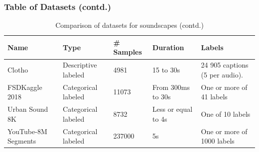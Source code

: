 \begin{frame}
    \frametitle{Table of Datasets (contd.)}

    \begin{table}[ht]
        \centering
        \caption{Comparison of datasets for soundscapes (contd.)}
        \begin{tabularx}{\textwidth}{|X|X|X|X|X|}
            \hline
            \textbf{Name}                                           &
            \textbf{Type}                                           &
            \textbf{\# Samples}                                     &
            \textbf{Duration}                                       &
            \textbf{Labels}                                           \\ \hline

            Clotho \cite{drossos_clotho_2019}                       &
            Descriptive labeled                                     &
            4981                                                    &
            15 to 30s                                               &
            24 905 captions (5 per audio).                            \\ \hline

            FSDKaggle 2018 \cite{fonseca_general-purpose_2018}      &
            Categorical labeled                                     &
            11073                                                   &
            From 300ms to 30s                                       &
            One or more of 41 labels                                  \\ \hline

            Urban Sound 8K \cite{salamon_dataset_2014}              &
            Categorical labeled                                     &
            8732                                                    &
            Less or equal to 4s                                     &
            One of 10 labels                                          \\ \hline

            YouTube-8M Segments \cite{abu-el-haija_youtube-8m_2016} &
            Categorical labeled                                     &
            237000                                                  &
            5s                                                      &
            One or more of 1000 labels                                \\ \hline
        \end{tabularx}
    \end{table}
\end{frame}



